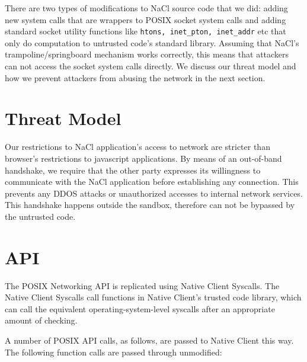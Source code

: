\documentclass[a4paper,10pt]{article}
\begin{document}
There are two types of modifications to NaCl source code that we did: adding
new system calls that are wrappers to POSIX socket system calls and adding
standard socket utility functions like  \texttt{htons, inet\_pton, inet\_addr} 
etc that only do computation to untrusted code's standard library. Assuming
that NaCl's trampoline/springboard mechanism works correctly, this means that
attackers can not access the socket system calls directly. We discuss our
threat model and how we prevent attackers from abusing the network in the next
section.

\section{Threat Model}

Our restrictions to NaCl application's access to network are stricter than
browser's restrictions to javascript applications. By means of an out-of-band
handshake, we require that the other party expresses its willingness to
communicate with the NaCl application before establishing any connection. This
prevents any DDOS attacks or unauthorized accesses to internal network
services. This handshake happens outside the sandbox, therefore can not be
bypassed by the untrusted code.

\section{API}

The POSIX Networking API is replicated using Native Client Syscalls.  The
Native Client Syscalls call functions in Native Client's trusted code library,
which can call the equivalent operating-system-level syscalls after an
appropriate amount of checking.

A number of POSIX API calls, as follows, are passed to Native Client this way.
The following function calls are passed through unmodified:
\end{document}
